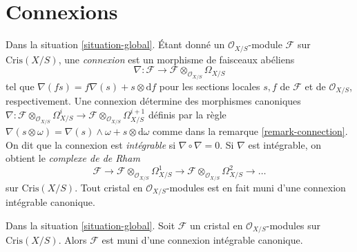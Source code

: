 \section{Connexions}
\label{section-connections}

\noindent
Dans la situation \ref{situation-global}.
Étant donné un $\mathcal{O}_{X/S}$-module $\mathcal{F}$ sur $\text{Cris}(X/S)$,
une {\it connexion} est un morphisme de faisceaux abéliens
$$
\nabla :
\mathcal{F}
\longrightarrow
\mathcal{F} \otimes_{\mathcal{O}_{X/S}} \Omega_{X/S}
$$
tel que $\nabla(f s) = f\nabla(s) + s \otimes \text{d}f$
pour les sections locales $s, f$ de $\mathcal{F}$ et de $\mathcal{O}_{X/S}$, respectivement.
Une connexion détermine des morphismes canoniques
$
\nabla :
\mathcal{F} \otimes_{\mathcal{O}_{X/S}} \Omega^i_{X/S}
\longrightarrow
\mathcal{F} \otimes_{\mathcal{O}_{X/S}} \Omega^{i + 1}_{X/S}
$
définis par la règle $\nabla(s \otimes \omega) =
\nabla(s) \wedge \omega + s \otimes \text{d}\omega$
comme dans la remarque \ref{remark-connection}. On dit que la connexion est
{\it intégrable} si $\nabla \circ \nabla = 0$. Si $\nabla$ est intégrable,
on obtient le {\it complexe de de Rham}
$$
\mathcal{F} \to
\mathcal{F} \otimes_{\mathcal{O}_{X/S}} \Omega^1_{X/S} \to
\mathcal{F} \otimes_{\mathcal{O}_{X/S}} \Omega^2_{X/S} \to \ldots
$$
sur $\text{Cris}(X/S)$. Tout cristal en
$\mathcal{O}_{X/S}$-modules est en fait muni d'une connexion
intégrable canonique.

\begin{lemma}
\label{lemma-automatic-connection}
Dans la situation \ref{situation-global}.
Soit $\mathcal{F}$ un cristal en $\mathcal{O}_{X/S}$-modules
sur $\text{Cris}(X/S)$. Alors $\mathcal{F}$ est muni d'une
connexion intégrable canonique.
\end{lemma}

